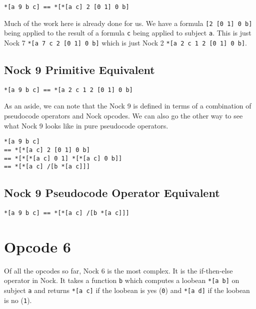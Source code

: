 \documentclass[twoside]{article}
\begin{document}
\begin{lstlisting}[style=listingblock]
*[a 9 b c] == *[*[a c] 2 [0 1] 0 b]
\end{lstlisting}

Much of the work here is already done for us. We have a formula \lstinline[style=inlinecode]{[2 [0 1] 0 b]} being applied to the result of a formula \lstinline[style=inlinecode]{c} being applied to subject \lstinline[style=inlinecode]{a}. This is just Nock 7 \lstinline[style=inlinecode]{*[a 7 c 2 [0 1] 0 b]} which is just Nock 2
\lstinline[style=inlinecode]{*[a 2 c 1 2 [0 1] 0 b]}.

\subsection{Nock 9 Primitive Equivalent}

\begin{lstlisting}[style=listingblock]
*[a 9 b c] == *[a 2 c 1 2 [0 1] 0 b]
\end{lstlisting}

As an aside, we can note that the Nock 9 is defined in terms of a combination of pseudocode operators and Nock opcodes. We can also go the other way to see what Nock 9 looks like in pure pseudocode operators.

\begin{lstlisting}[style=listingblock]
*[a 9 b c]
== *[*[a c] 2 [0 1] 0 b]
== *[*[*[a c] 0 1] *[*[a c] 0 b]]
== *[*[a c] /[b *[a c]]]
\end{lstlisting}

\subsection{Nock 9 Pseudocode Operator Equivalent}

\begin{lstlisting}[style=listingblock]
*[a 9 b c] == *[*[a c] /[b *[a c]]]
\end{lstlisting}

\section{Opcode 6}

Of all the opcodes so far, Nock 6 is the most complex. It is the if-then-else operator in Nock. It takes a function \lstinline[style=inlinecode]{b} which computes a loobean \lstinline[style=inlinecode]{*[a b]} on subject \lstinline[style=inlinecode]{a} and returns \lstinline[style=inlinecode]{*[a c]} if the loobean is yes (\lstinline[style=inlinecode]{0}) and \lstinline[style=inlinecode]{*[a d]} if the loobean is no (\lstinline[style=inlinecode]{1}).
\end{document}
